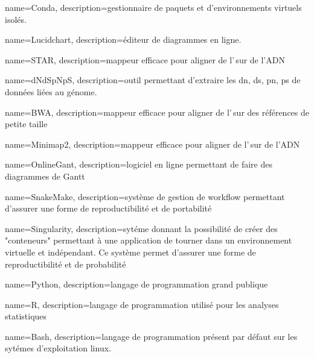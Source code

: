  {
    name=Conda,
    description={gestionnaire de paquets et d'environnements virtuels isolés. \cite{conda}}
}
\newcommand{\Conda}{\gls{Conda}}


 {
    name=Lucidchart,
    description={éditeur de diagrammes en ligne.\cite{lucidchart}}
}

 {
    name=STAR,
    description={\gls{mappeur} efficace pour aligner de l'\ARN\,sur de l'ADN \cite{star}}
}

 {
    name=dNdSpNpS,
    description={outil permettant d'extraire les \acrshort{dn}, \acrshort{ds}, \acrshort{pn}, \acrshort{ps} de données liées au génome. \cite{dNdSpNpS}}
}

 {
    name=BWA,
    description={\gls{mappeur} efficace pour aligner de l'\ARN\,sur des références de petite taille \cite{bwa}}
}
\newcommand{\BWA}{\gls{BWA}}

 {
    name=Minimap2,
    description={\gls{mappeur} efficace pour aligner de l'\ARN\,sur de l'ADN \cite{minimap2}}
}

 {
    name=OnlineGant,
    description={logiciel en ligne permettant de faire des diagrammes de Gantt \cite{gantt}}
}

 {
    name=SnakeMake,
    description={système de gestion de workflow permettant d'assurer une forme de reproductibilité et de portabilité \cite{snakemake} }
}
\newcommand{\SnakeMake}{\gls{SnakeMake}}


 {
    name=Singularity,
    description={sytéme donnant la possibilité de créer des "conteneurs" permettant à une application de tourner dans un environnement virtuelle et indépendant. Ce système permet d'assurer une forme de reproductibilité et de probabilité}
}
\newcommand{\Singularity}{\gls{Singularity}}

 {
    name=Python,
    description={langage de programmation grand publique \cite{python}}
}
\newcommand{\Python}{\gls{Python}}

 {
    name=R,
    description={langage de programmation utilisé pour les analyses statistiques \cite{r}}
}

 {
    name=Bash,
    description={langage de programmation présent par défaut sur les sytémes d'exploitation linux. \cite{bash}}
}


